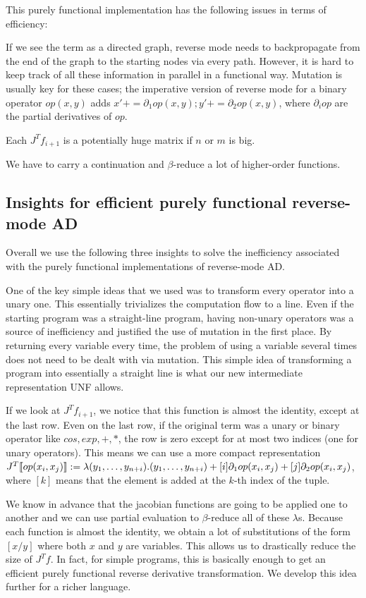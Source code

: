 This purely functional implementation has the following issues in terms of efficiency: 

If we see the term as a directed graph, reverse mode needs to backpropagate from the end of the graph to the starting nodes via every path.
However, it is hard to keep track of all these information in parallel in a functional way.
Mutation is usually key for these cases; 
the imperative version of reverse mode for a binary operator $op(x,y)$ adds $x'+= \partial_1op(x,y);y'+= \partial_2op(x,y)$, 
where $\partial_iop$ are the partial derivatives of $op$.

Each $J^Tf_{i+1}$ is a potentially huge matrix if $n$ or $m$ is big.

We have to carry a continuation and $\beta$-reduce a lot of higher-order functions.

\subsection{Insights for efficient purely functional reverse-mode AD}
\label{subsec:insights}
Overall we use the following three insights to solve the inefficiency associated with the purely functional implementations of reverse-mode AD.

One of the key simple ideas that we used was to transform every operator into a unary one. 
This essentially trivializes the computation flow to a line. 
Even if the starting program was a straight-line program, 
having non-unary operators was a source of inefficiency and justified the use of mutation in the first place.
By returning every variable every time, the problem of using a variable several times does not need to be dealt with via mutation. 
This simple idea of transforming a program into essentially a straight line is what our new intermediate representation UNF allows.

If we look at $J^Tf_{i+1}$, we notice that this function is almost the identity, except at the last row. 
Even on the last row, if the original term was a unary or binary operator like $cos, exp, +, *$, 
the row is zero except for at most two indices (one for unary operators).
This means we can use a more compact representation $J^T\llbracket op(x_i,x_j)\rrbracket:=\lambda (y_1,\ldots,y_{n+i}).(y_1,\ldots,y_{n+i})+[i]\partial_1op(x_i,x_j)+[j]\partial_2op(x_i,x_j)$, 
where $[k]$ means that the element is added at the $k$-th index of the tuple.

We know in advance that the jacobian functions are going to be applied one to another and we can use partial evaluation to $\beta$-reduce all of these $\lambda$s.
Because each function is almost the identity, we obtain a lot of substitutions of the form $[x/y]$ where both $x$ and $y$ are variables. 
This allows us to drastically reduce the size of $J^Tf$. In fact, for simple programs, this is basically enough to get an efficient purely functional reverse derivative transformation.
We develop this idea further for a richer language.
